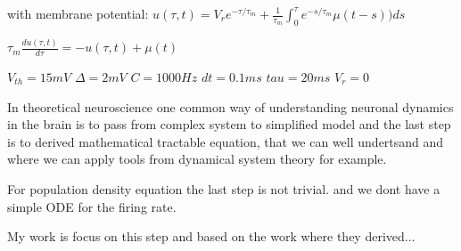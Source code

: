 \documentclass[a4paper,12pt,twoside]{article}
\begin{document}
with membrane potential:
$u(\tau,t)=V_r e^{-\tau/\tau_m}+\frac{1}{\tau_m}\int_0^\tau  e^{-s/\tau_m}\mu(t-s))ds$

$\tau_m\frac{du(\tau,t)}{d\tau}=-u(\tau,t)+\mu(t)$

$V_{th}=15  mV$
$\Delta = 2     mV$
$C=1000 Hz$
$dt=0.1    ms$
$tau=20   ms$
$V_r=0  $


In theoretical neuroscience one common way of understanding neuronal dynamics in the brain is to pass from complex system to simplified model and the last step is to derived mathematical tractable equation, that we can well undertsand and where we can apply  tools from dynamical system theory for example. 

For population density equation the last step is not trivial. and we dont have a simple ODE for the firing rate.

My work is focus on this step and based on the work where they derived...




\mbox{}
\nocite{*}
%


\end{document}
